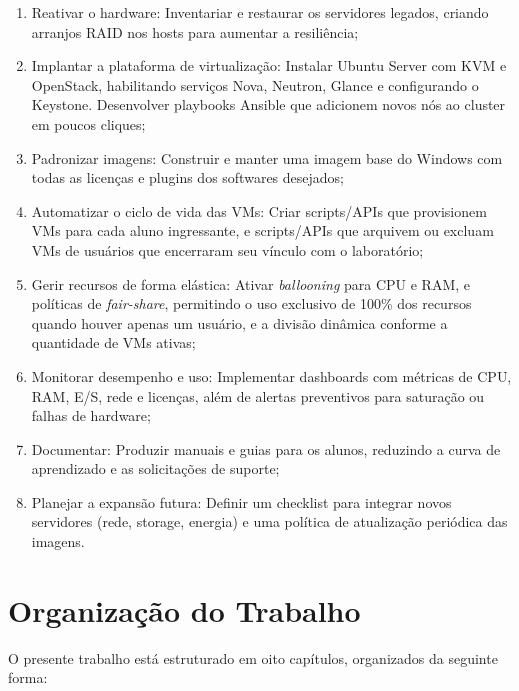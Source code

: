 \begin{enumerate}
    \item Reativar o hardware: Inventariar e restaurar os servidores legados, criando arranjos RAID nos hosts para aumentar a resiliência;
    \item Implantar a plataforma de virtualização: Instalar Ubuntu Server com KVM e OpenStack, habilitando serviços Nova, Neutron, Glance e configurando o Keystone. Desenvolver playbooks Ansible que adicionem novos nós ao cluster em poucos cliques;
    \item Padronizar imagens: Construir e manter uma imagem base do Windows com todas as licenças e plugins dos softwares desejados;
    \item Automatizar o ciclo de vida das VMs: Criar scripts/APIs que provisionem VMs para cada aluno ingressante, e scripts/APIs que arquivem ou excluam VMs de usuários que encerraram seu vínculo com o laboratório;
    \item Gerir recursos de forma elástica: Ativar \textit{ballooning} para CPU e RAM, e políticas de \textit{fair-share}, permitindo o uso exclusivo de 100\% dos recursos quando houver apenas um usuário, e a divisão dinâmica conforme a quantidade de VMs ativas;
    \item Monitorar desempenho e uso: Implementar dashboards com métricas de CPU, RAM, E/S, rede e licenças, além de alertas preventivos para saturação ou falhas de hardware;
    \item Documentar: Produzir manuais e guias para os alunos, reduzindo a curva de aprendizado e as solicitações de suporte;
    \item Planejar a expansão futura: Definir um checklist para integrar novos servidores (rede, storage, energia) e uma política de atualização periódica das imagens.
\end{enumerate}

\section{Organização do Trabalho}

O presente trabalho está estruturado em oito capítulos, organizados da seguinte forma:

